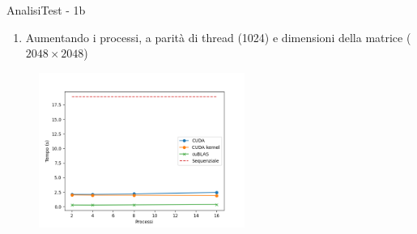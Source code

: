 \begin{frame}{Analisi}{Test - 1b}
    \begin{enumerate}
        \item[1b] Aumentando i processi, a parità di thread (1024) e dimensioni della matrice ($2048 \times 2048$)
    \end{enumerate}

    \begin{figure}[H]
        \centering
        \includegraphics[width=0.6\textwidth]{./imgs/graphs/caso_a1.png}
    \end{figure}
\end{frame}

